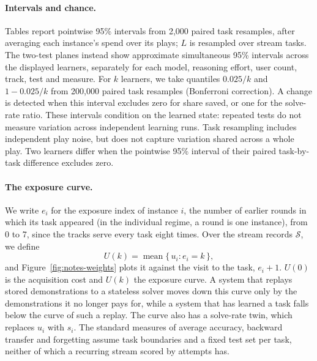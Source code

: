 \paragraph{Intervals and chance.} Tables report pointwise 95\% intervals from 2{,}000 paired task resamples, after averaging each instance's spend over its plays; $L$ is resampled over stream tasks. The two-test planes instead show approximate simultaneous 95\% intervals across the displayed learners, separately for each model, reasoning effort, user count, track, test and measure. For $k$ learners, we take quantiles $0.025/k$ and $1-0.025/k$ from 200{,}000 paired task resamples (Bonferroni correction). A change is detected when this interval excludes zero for share saved, or one for the solve-rate ratio. These intervals condition on the learned state: repeated tests do not measure variation across independent learning runs. Task resampling includes independent play noise, but does not capture variation shared across a whole play. Two learners differ when the pointwise 95\% interval of their paired task-by-task difference excludes zero.

\paragraph{The exposure curve.} We write $e_i$ for the exposure index of instance $i$, the number of earlier rounds in which its task appeared (in the individual regime, a round is one instance), from 0 to 7, since the tracks serve every task eight times. Over the stream records $\mathcal{S}$, we define
\begin{equation}
U(k) = \operatorname{mean}\{\, u_i : e_i = k \,\},
\label{eq:metrics}
\end{equation}
and Figure~\ref{fig:notes-weights} plots it against the visit to the task, $e_i + 1$. $U(0)$ is the acquisition cost and $U(k)$ the exposure curve. A system that replays stored demonstrations to a stateless solver moves down this curve only by the demonstrations it no longer pays for, while a system that has learned a task falls below the curve of such a replay. The curve also has a solve-rate twin, which replaces $u_i$ with $s_i$. The standard measures of average accuracy, backward transfer and forgetting \citep{lopezpaz2017gradient} assume task boundaries and a fixed test set per task, neither of which a recurring stream scored by attempts has.

